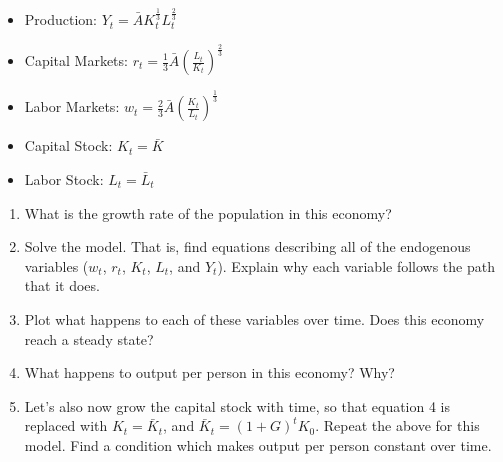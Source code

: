 \documentclass{article}
\begin{document}
\begin{itemize}
\item Production: $Y_t = \bar{A} K_t^\frac13 L_t^\frac23$
\item Capital Markets: $r_t = \frac13 \bar{A} \left( \frac{L_t}{K_t} \right)^\frac23$
\item Labor Markets: $w_t = \frac23 \bar{A} \left( \frac{K_t}{L_t} \right)^\frac13$
\item Capital Stock: $K_t = \bar{K}$
\item Labor Stock: $L_t = \bar{L}_t$
\end{itemize}

\begin{enumerate}
\item What is the growth rate of the population in this economy?
\item Solve the model. That is, find equations describing all of the endogenous variables ($w_t$, $r_t$, $K_t$, $L_t$, and $Y_t$). Explain why each variable follows the path that it does.
\item Plot what happens to each of these variables over time. Does this economy reach a steady state?
\item What happens to output per person in this economy? Why?
\item Let's also now grow the capital stock with time, so that equation 4 is replaced with $K_t = \bar{K}_t$, and $\bar{K}_t = (1+G)^t K_0$. Repeat the above for this model. Find a condition which makes output per person constant over time.
\end{enumerate}
\end{document}
